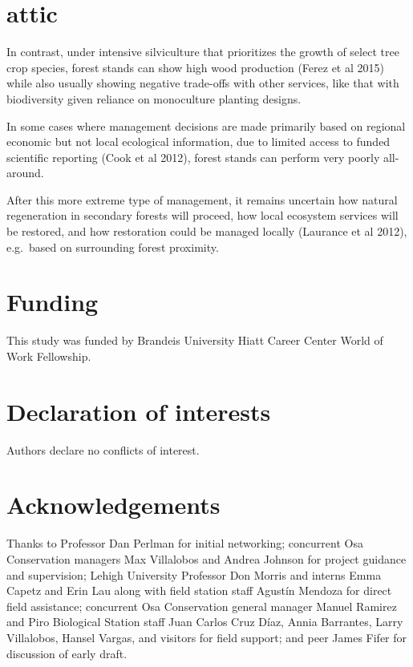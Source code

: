 \documentclass[
  12pt,
]{article}
\begin{document}
\hypertarget{attic}{%
\section*{attic}\label{attic}}

In contrast, under intensive silviculture that prioritizes the growth of select tree crop species, forest stands can show high wood production (Ferez et al 2015) while also usually showing negative trade-offs with other services, like that with biodiversity given reliance on monoculture planting designs.

In some cases where management decisions are made primarily based on regional economic but not local ecological information, due to limited access to funded scientific reporting (Cook et al 2012), forest stands can perform very poorly all-around.

After this more extreme type of management, it remains uncertain how natural regeneration in secondary forests will proceed, how local ecosystem services will be restored, and how restoration could be managed locally (Laurance et al 2012), e.g.~based on surrounding forest proximity.

\newpage

\hypertarget{funding}{%
\section*{Funding}\label{funding}}

This study was funded by Brandeis University Hiatt Career Center World of Work Fellowship.

\hypertarget{declaration-of-interests}{%
\section*{Declaration of interests}\label{declaration-of-interests}}

Authors declare no conflicts of interest.

\hypertarget{acknowledgements}{%
\section*{Acknowledgements}\label{acknowledgements}}

Thanks to Professor Dan Perlman for initial networking; concurrent Osa Conservation managers Max Villalobos and Andrea Johnson for project guidance and supervision; Lehigh University Professor Don Morris and interns Emma Capetz and Erin Lau along with field station staff Agustín Mendoza for direct field assistance; concurrent Osa Conservation general manager Manuel Ramirez and Piro Biological Station staff Juan Carlos Cruz Díaz, Annia Barrantes, Larry Villalobos, Hansel Vargas, and visitors for field support; and peer James Fifer for discussion of early draft.
\end{document}
